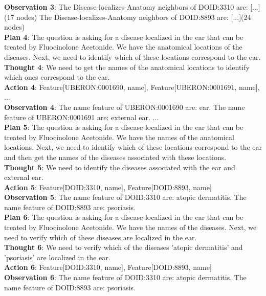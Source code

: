 \documentclass[11pt]{article}
\begin{document}
\begin{tcolorbox}[colback=white!10!white, colframe=blue!30!black, title=, boxrule=1pt, fontupper={\fontsize{7pt}{9pt}\selectfont}]
\justifying
\noindent
\textbf{Observation 3}: The Disease-localizes-Anatomy neighbors of DOID:3310 are: [...](17 nodes) The Disease-localizes-Anatomy neighbors of DOID:8893 are: [...](24 nodes)\\
\textbf{Plan 4}: The question is asking for a disease localized in the ear that can be treated by Fluocinolone Acetonide. We have the anatomical locations of the diseases. Next, we need to identify which of these locations correspond to the ear.\\
\textbf{Thought 4}: We need to get the names of the anatomical locations to identify which ones correspond to the ear.\\
\textbf{Action 4}: Feature[UBERON:0001690, name], Feature[UBERON:0001691, name], ...\\
\textbf{Observation 4}: The name feature of UBERON:0001690 are: ear. The name feature of UBERON:0001691 are: external ear. ...\\ 
\textbf{Plan 5}: The question is asking for a disease localized in the ear that can be treated by Fluocinolone Acetonide. We have the names of the anatomical locations. Next, we need to identify which of these locations correspond to the ear and then get the names of the diseases associated with these locations.\\
\textbf{Thought 5}: We need to identify the diseases associated with the ear and external ear.\\
\textbf{Action 5}: Feature[DOID:3310, name], Feature[DOID:8893, name]\\
\textbf{Observation 5}: The name feature of DOID:3310 are: atopic dermatitis. The name feature of DOID:8893 are: psoriasis. \\
\textbf{Plan 6}: The question is asking for a disease localized in the ear that can be treated by Fluocinolone Acetonide. We have the names of the diseases. Next, we need to verify which of these diseases are localized in the ear.\\
\textbf{Thought 6}: We need to verify which of the diseases 'atopic dermatitis' and 'psoriasis' are localized in the ear.\\
\textbf{Action 6}: Feature[DOID:3310, name], Feature[DOID:8893, name]\\
\textbf{Observation 6}: The name feature of DOID:3310 are: atopic dermatitis. The name feature of DOID:8893 are: psoriasis. \\

\end{tcolorbox}
\end{document}
